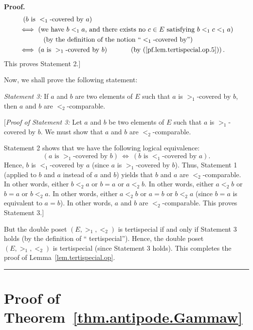 \documentclass[numbers=enddot,12pt,final,onecolumn,notitlepage,abstracton]{scrartcl}
\theoremstyle{definition}
\newenvironment{proof}[1][Proof]{\noindent\textbf{#1.} }{\ \rule{0.5em}{0.5em}}
\newenvironment{verlong}{}{}
\begin{document}
\begin{verlong}
\begin{proof}
\begin{align*}
& \ \left(  b\text{ is }<_{1}\text{-covered by }a\right)  \\
& \Longleftrightarrow\ \left(  \text{we have }b<_{1}a\text{, and there exists
no }c\in E\text{ satisfying }b<_{1}c<_{1}a\right)  \\
& \ \ \ \ \ \ \ \ \ \ \left(  \text{by the definition of the notion
\textquotedblleft}<_{1}\text{-covered by\textquotedblright}\right)  \\
& \Longleftrightarrow\ \left(  a\text{ is }>_{1}\text{-covered by }b\right)
\ \ \ \ \ \ \ \ \ \ \left(  \text{by (\ref{pf.lem.tertispecial.op.5})}\right)
.
\end{align*}
This proves Statement 2.]

Now, we shall prove the following statement:

\textit{Statement 3:} If $a$ and $b$ are two elements of $E$ such that $a$ is
$>_{1}$-covered by $b$, then $a$ and $b$ are $<_{2}$-comparable.

[\textit{Proof of Statement 3:} Let $a$ and $b$ be two elements of $E$ such
that $a$ is $>_{1}$-covered by $b$. We must show that $a$ and $b$ are $<_{2}$-comparable.

Statement 2 shows that we have the following logical equivalence:%
\[
\left(  a\text{ is }>_{1}\text{-covered by }b\right)  \ \Longleftrightarrow
\ \left(  b\text{ is }<_{1}\text{-covered by }a\right)  .
\]
Hence, $b$ is $<_{1}$-covered by $a$ (since $a$ is $>_{1}$-covered by $b$).
Thus, Statement 1 (applied to $b$ and $a$ instead of $a$ and $b$) yields that
$b$ and $a$ are $<_{2}$-comparable. In other words, either $b<_{2}a$ or $b=a$
or $a<_{2}b$. In other words, either $a<_{2}b$ or $b=a$ or $b<_{2}a$. In other
words, either $a<_{2}b$ or $a=b$ or $b<_{2}a$ (since $b=a$ is equivalent to
$a=b$). In other words, $a$ and $b$ are $<_{2}$-comparable. This proves
Statement 3.]

But the double poset $\left(  E,>_{1},<_{2}\right)  $ is tertispecial if and
only if Statement 3 holds (by the definition of \textquotedblleft
tertispecial\textquotedblright). Hence, the double poset $\left(
E,>_{1},<_{2}\right)  $ is tertispecial (since Statement 3 holds). This
completes the proof of Lemma~\ref{lem.tertispecial.op}.
\end{proof}
\end{verlong}

\section{Proof of Theorem~\ref{thm.antipode.Gammaw}}
\label{sect.proof}
\end{document}
